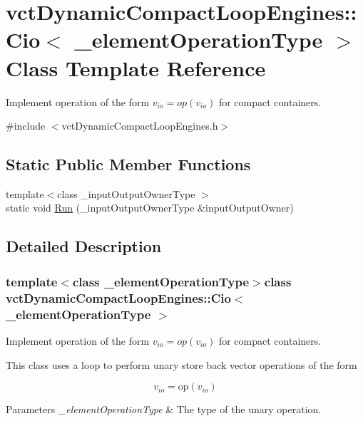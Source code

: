 \hypertarget{classvct_dynamic_compact_loop_engines_1_1_cio}{\section{vct\-Dynamic\-Compact\-Loop\-Engines\-:\-:Cio$<$ \-\_\-element\-Operation\-Type $>$ Class Template Reference}
\label{classvct_dynamic_compact_loop_engines_1_1_cio}
}


Implement operation of the form $v_{io} = op(v_{io})$ for compact containers.  




{\ttfamily \#include $<$vct\-Dynamic\-Compact\-Loop\-Engines.\-h$>$}

\subsection*{Static Public Member Functions}
\begin{DoxyCompactItemize}
\item 
{\footnotesize template$<$class \-\_\-input\-Output\-Owner\-Type $>$ }\\static void \hyperlink{classvct_dynamic_compact_loop_engines_1_1_cio_a5ca815a1755482c7dedfebacd8fb3c22}{Run} (\-\_\-input\-Output\-Owner\-Type \&input\-Output\-Owner)
\end{DoxyCompactItemize}


\subsection{Detailed Description}
\subsubsection*{template$<$class \-\_\-element\-Operation\-Type$>$class vct\-Dynamic\-Compact\-Loop\-Engines\-::\-Cio$<$ \-\_\-element\-Operation\-Type $>$}

Implement operation of the form $v_{io} = op(v_{io})$ for compact containers. 

This class uses a loop to perform unary store back vector operations of the form

\[ v_{io} = \mathrm{op}(v_{io}) \]


\begin{DoxyParams}{Parameters}
{\em \-\_\-element\-Operation\-Type} & The type of the unary operation. \\
\hline
\end{DoxyParams}


